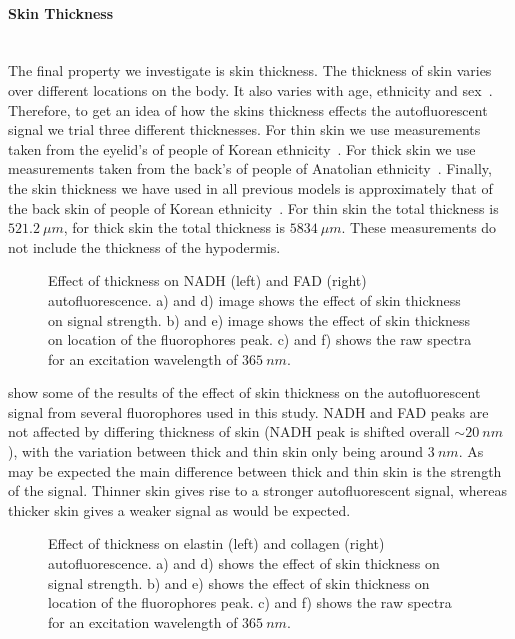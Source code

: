 \FloatBarrier
\paragraph*{Skin Thickness}\hspace{0pt}\\
The final property we investigate is skin thickness.
The thickness of skin varies over different locations on the body.
It also varies with age, ethnicity and sex~\cite{lee2002skin,oltulu2018measurement,southwood1955thickness}.
Therefore, to get an idea of how the skins thickness effects the autofluorescent signal we trial three different thicknesses.
For thin skin we use measurements taken from the eyelid's of people of Korean ethnicity~\cite{lee2002skin}.
For thick skin we use measurements taken from the back's of people of Anatolian ethnicity~\cite{oltulu2018measurement}.
Finally, the skin thickness we have used in all previous models is approximately that of the back skin of people of Korean ethnicity~\cite{lee2002skin}.
For thin skin the total thickness is $521.2~\mu m$, for thick skin the total thickness is $5834~\mu m$.
These measurements do not include the thickness of the hypodermis.

\begin{figure}[!htbp]
    \centering
    \caption{Effect of thickness on NADH (left) and FAD (right) autofluorescence. a) and d) image shows the effect of skin thickness on signal strength. b) and e) image shows the effect of skin thickness on location of the fluorophores peak. c) and f) shows the raw spectra for an excitation wavelength of $365~nm$.}%
    \label{fig:nadhfad-thick}%
\end{figure}

 show some of the results of the effect of skin thickness on the autofluorescent signal from several fluorophores used in this study.
NADH and FAD peaks are not affected by differing thickness of skin (NADH peak is shifted overall $\sim20~nm$), with the variation between thick and thin skin only being around $3~nm$.
As may be expected the main difference between thick and thin skin is the strength of the signal.
Thinner skin gives rise to a stronger autofluorescent signal, whereas thicker skin gives a weaker signal as would be expected.

\begin{figure}[!htbp]
    \centering
    \caption{Effect of thickness on elastin (left) and collagen (right) autofluorescence. a) and d) shows the effect of skin thickness on signal strength. b) and e) shows the effect of skin thickness on location of the fluorophores peak. c) and f) shows the raw spectra for an excitation wavelength of $365~nm$.}%
    \label{fig:elscol-thick}%
\end{figure}


